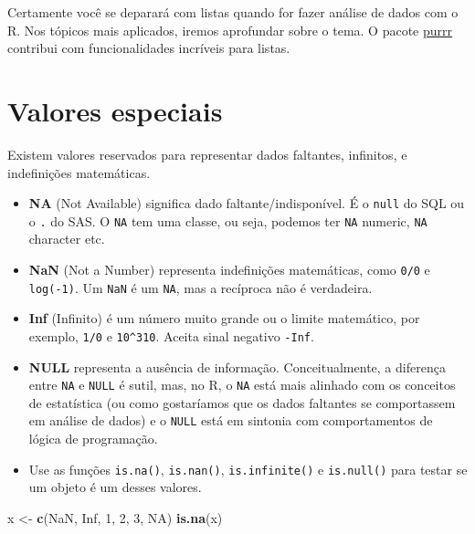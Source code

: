 \documentclass[
]{book}
\newenvironment{Shaded}{\begin{snugshade}}{\end{snugshade}}
\newcommand{\DecValTok}[1]{\textcolor[rgb]{0.00,0.00,0.81}{#1}}
\newcommand{\KeywordTok}[1]{\textcolor[rgb]{0.13,0.29,0.53}{\textbf{#1}}}
\newcommand{\NormalTok}[1]{#1}
\newcommand{\OtherTok}[1]{\textcolor[rgb]{0.56,0.35,0.01}{#1}}
\newcommand{\StringTok}[1]{\textcolor[rgb]{0.31,0.60,0.02}{#1}}
\providecommand{\tightlist}{%
  \setlength{\itemsep}{0pt}\setlength{\parskip}{0pt}}
\begin{document}
Certamente você se deparará com listas quando for fazer análise de dados com o R. Nos tópicos mais aplicados, iremos aprofundar sobre o tema. O pacote \href{https://github.com/hadley/purrr}{purrr} contribui com funcionalidades incríveis para listas.

\hypertarget{valores-especiais}{%
\section{Valores especiais}\label{valores-especiais}}

Existem valores reservados para representar dados faltantes, infinitos, e indefinições matemáticas.

\begin{itemize}
\tightlist
\item
  \textbf{NA} (Not Available) significa dado faltante/indisponível. É o \texttt{null} do SQL ou o \texttt{.} do SAS. O \texttt{NA} tem uma classe, ou seja, podemos ter \texttt{NA} numeric, \texttt{NA} character etc.
\item
  \textbf{NaN} (Not a Number) representa indefinições matemáticas, como \texttt{0/0} e \texttt{log(-1)}. Um \texttt{NaN} é um \texttt{NA}, mas a recíproca não é verdadeira.
\item
  \textbf{Inf} (Infinito) é um número muito grande ou o limite matemático, por exemplo, \texttt{1/0} e \texttt{10\^{}310}. Aceita sinal negativo \texttt{-Inf}.
\item
  \textbf{NULL} representa a ausência de informação. Conceitualmente, a diferença entre \texttt{NA} e \texttt{NULL} é sutil, mas, no R, o \texttt{NA} está mais alinhado com os conceitos de estatística (ou como gostaríamos que os dados faltantes se comportassem em análise de dados) e o \texttt{NULL} está em sintonia com comportamentos de lógica de programação.
\item
  Use as funções \texttt{is.na()}, \texttt{is.nan()}, \texttt{is.infinite()} e \texttt{is.null()} para testar se um objeto é um desses valores.
\end{itemize}

\begin{Shaded}
\begin{Highlighting}[]
\NormalTok{x <{-}}\StringTok{ }\KeywordTok{c}\NormalTok{(}\OtherTok{NaN}\NormalTok{, }\OtherTok{Inf}\NormalTok{, }\DecValTok{1}\NormalTok{, }\DecValTok{2}\NormalTok{, }\DecValTok{3}\NormalTok{, }\OtherTok{NA}\NormalTok{)}
\KeywordTok{is.na}\NormalTok{(x)}
\end{Highlighting}
\end{Shaded}
\end{document}
